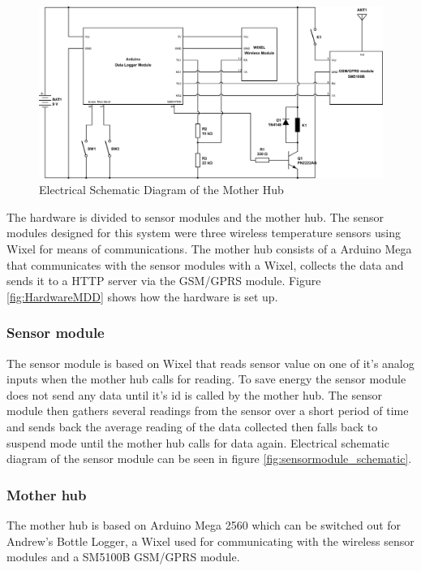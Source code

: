 \begin{figure}
\centering
\includegraphics[width=1\linewidth]{graphics/motherhub_schematic}
\caption{Electrical Schematic Diagram of the Mother Hub\label{fig:motherhub_schematic}}
\end{figure}

The hardware is divided to sensor modules and the mother hub. The sensor modules 
designed for this system were three wireless temperature sensors using Wixel\cite{wixel}
for means of communications. The mother hub consists of a Arduino Mega\cite{arduinoMega}
that communicates with the sensor modules with a Wixel\cite{wixel}, collects the data 
and sends it to a HTTP server via the GSM/GPRS module\cite{SM5100B}. 
Figure \ref{fig:HardwareMDD} shows how the hardware is set up. 

\subsubsection{Sensor module}
The sensor module is based on Wixel\cite{wixel} that reads sensor value on one of it's
analog inputs when the mother hub calls for reading. To save energy the sensor module does
not send any data until it's id is called by the mother hub. The sensor module then 
gathers several readings from the sensor over a short period of time and sends back the 
average reading of the data collected then falls back to suspend mode until the mother 
hub calls for data again. Electrical schematic diagram of the sensor module can
be seen in figure \ref{fig:sensormodule_schematic}.

\subsubsection{Mother hub}
The mother hub is based on Arduino Mega 2560\cite{arduinoMega} which can be switched out 
for Andrew's Bottle Logger\cite{ALog-BottleLogger}, a Wixel\cite{wixel} used for 
communicating with the wireless sensor modules and a SM5100B GSM/GPRS 
module\cite{SM5100B}. 

